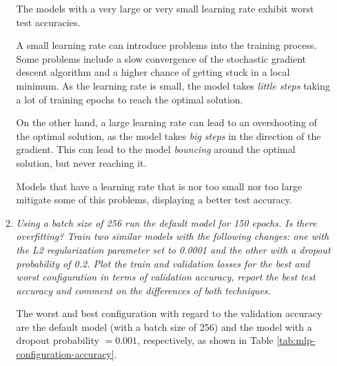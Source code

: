 \documentclass[12pt]{article}
\begin{document}
\begin{enumerate}[leftmargin=\labelsep]
\begin{enumerate}[label=\alph*)]
                    The models with a very large or very small learning rate exhibit worst test accuracies.

                    \vspace{12pt}

                    A small learning rate can introduce problems into the training process. Some problems include a slow convergence of the stochastic gradient descent algorithm and a higher chance of getting stuck in a local minimum. As the learning rate is small, the model takes \textit{little steps} taking a lot of training epochs to reach the optimal solution.

                    \vspace{12pt}

                    On the other hand, a large learning rate can lead to an overshooting of the optimal solution, as the model takes \textit{big steps} in the direction of the gradient. This can lead to the model \textit{bouncing} around the optimal solution, but never reaching it.

                    \vspace{12pt}

                    Models that have a learning rate that is nor too small nor too large mitigate some of this problems, displaying a better test accuracy.

                    \vspace{12pt}

              \item \textit{Using a batch size of 256 run the default model for 150 epochs. Is there
                        overfitting?
                        Train two similar models with the following changes: one with the L2
                        regularization parameter set to 0.0001 and the other with a dropout probability of 0.2.
                        Plot the train and validation losses for the best and worst configuration in terms of
                        validation accuracy, report the best test accuracy and comment on the differences of
                        both techniques.}

                    \vspace{12pt}

                    The worst and best configuration with regard to the validation accuracy are the default model (with a batch size of 256) and the model with a dropout probability $= 0.001$, respectively, as shown in Table \ref{tab:mlp-configuration-accuracy}.


\end{enumerate}
\end{enumerate}
\end{document}
